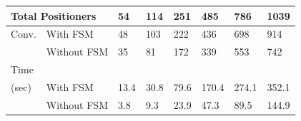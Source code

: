 \documentclass[]{spie}  %
\begin{document}
\begin{figure}[H]
\begin{minipage}{7.5cm}
{				\tiny
				\begin{tabular}{|l|l|l|l|l|l|l|l|}
					\hline
					\multicolumn{2}{|l|}{Total Positioners}  & 54 & 114 & 251 & 485 & 786 & 1039\\
					\hline
					Conv. & With FSM  & 48 & 103  & 222 & 436 & 698 & 914 \\
					\cline{2-8}
					& Without FSM & 35  & 81 & 172 & 339 & 553 & 742 \\
					\hline
					Time\\(sec) & With FSM  & 13.4 & 30.8 & 79.6 & 170.4 & 274.1 & 352.1 \\
					\cline{2-8}
					& Without FSM  & 3.8  & 9.3 & 23.9 & 47.3 & 89.5  & 144.9 \\
					\hline
				\end{tabular}
				}
				\label{configuration4_result} 
			\end{minipage}
		\end{figure}
\end{document}

